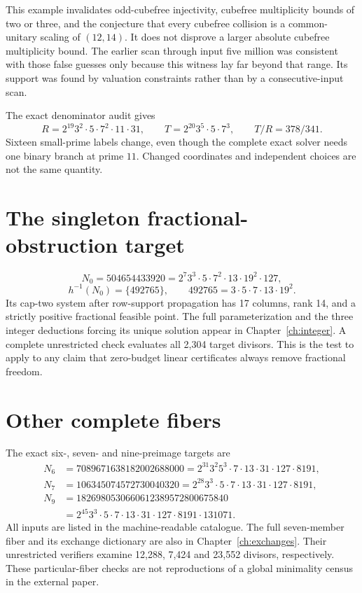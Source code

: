 This example invalidates odd-cubefree injectivity, cubefree multiplicity bounds
of two or three, and the conjecture that every cubefree collision is a
common-unitary scaling of $(12,14)$. It does not disprove a larger absolute
cubefree multiplicity bound. The earlier scan through input five million was
consistent with those false guesses only because this witness lay far beyond
that range. Its support was found by valuation constraints rather than by a
consecutive-input scan.

The exact denominator audit gives
\[
 R=2^{19}3^2\cdot5\cdot7^2\cdot11\cdot31,
 \qquad T=2^{20}3^5\cdot5\cdot7^3,\qquad T/R=378/341.
\]
Sixteen small-prime labels change, even though the complete exact solver needs
one binary branch at prime $11$. Changed coordinates and independent choices
are not the same quantity.

\section{The singleton fractional-obstruction target}
\[
 N_0=504654433920=2^7 3^3\cdot5\cdot7^2\cdot13\cdot19^2\cdot127,
\]
\[
 h^{-1}(N_0)=\{492765\},\qquad
 492765=3\cdot5\cdot7\cdot13\cdot19^2.
\]
Its cap-two system after row-support propagation has 17 columns, rank 14,
and a strictly positive fractional feasible point. The full parameterization
and the three integer deductions forcing its unique solution appear in
Chapter~\ref{ch:integer}. A complete unrestricted check evaluates all 2,304
target divisors. This is the test to apply to any claim that zero-budget linear
certificates always remove fractional freedom.

\section{Other complete fibers}
The exact six-, seven- and nine-preimage targets are
\begin{align*}
 N_6&=7089671638182002688000
     =2^{31}3^2 5^3\cdot7\cdot13\cdot31\cdot127\cdot8191,\\
 N_7&=106345074572730040320
     =2^{28}3^3\cdot5\cdot7\cdot13\cdot31\cdot127\cdot8191,\\
 N_9&=1826980530660612389572800675840\\
    &=2^{45}3^3\cdot5\cdot7\cdot13\cdot31\cdot127\cdot8191\cdot131071.
\end{align*}
All inputs are listed in the machine-readable catalogue. The full seven-member
fiber and its exchange dictionary are also in Chapter~\ref{ch:exchanges}.
Their unrestricted verifiers examine 12,288, 7,424 and 23,552 divisors,
respectively. These particular-fiber checks are not reproductions of a global
minimality census in the external paper.

